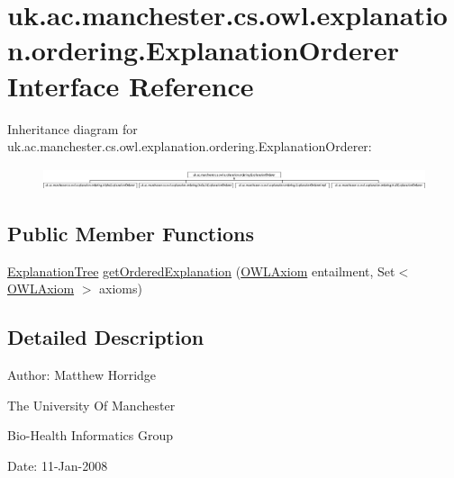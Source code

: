 \hypertarget{interfaceuk_1_1ac_1_1manchester_1_1cs_1_1owl_1_1explanation_1_1ordering_1_1_explanation_orderer}{\section{uk.\-ac.\-manchester.\-cs.\-owl.\-explanation.\-ordering.\-Explanation\-Orderer Interface Reference}
\label{interfaceuk_1_1ac_1_1manchester_1_1cs_1_1owl_1_1explanation_1_1ordering_1_1_explanation_orderer}
}
Inheritance diagram for uk.\-ac.\-manchester.\-cs.\-owl.\-explanation.\-ordering.\-Explanation\-Orderer\-:\begin{figure}[H]
\begin{center}
\leavevmode
\includegraphics[height=0.643678cm]{interfaceuk_1_1ac_1_1manchester_1_1cs_1_1owl_1_1explanation_1_1ordering_1_1_explanation_orderer}
\end{center}
\end{figure}
\subsection*{Public Member Functions}
\begin{DoxyCompactItemize}
\item 
\hyperlink{classuk_1_1ac_1_1manchester_1_1cs_1_1owl_1_1explanation_1_1ordering_1_1_explanation_tree}{Explanation\-Tree} \hyperlink{interfaceuk_1_1ac_1_1manchester_1_1cs_1_1owl_1_1explanation_1_1ordering_1_1_explanation_orderer_a66b1b088219ba3434a5bd66a193ead40}{get\-Ordered\-Explanation} (\hyperlink{interfaceorg_1_1semanticweb_1_1owlapi_1_1model_1_1_o_w_l_axiom}{O\-W\-L\-Axiom} entailment, Set$<$ \hyperlink{interfaceorg_1_1semanticweb_1_1owlapi_1_1model_1_1_o_w_l_axiom}{O\-W\-L\-Axiom} $>$ axioms)
\end{DoxyCompactItemize}


\subsection{Detailed Description}
Author\-: Matthew Horridge\par
 The University Of Manchester\par
 Bio-\/\-Health Informatics Group\par
 Date\-: 11-\/\-Jan-\/2008\par
\par
 


